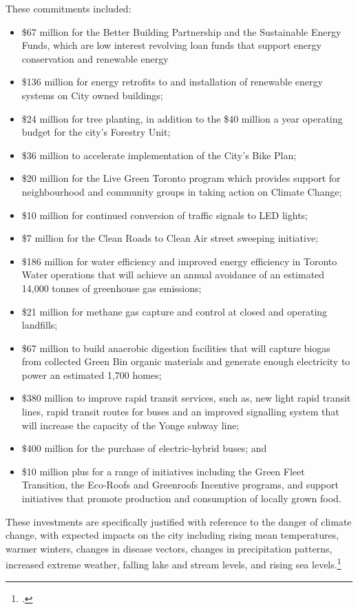 These commitments included:
\begin{itemize}
	\item \$67 million for the Better Building Partnership and the Sustainable Energy Funds, which are low interest revolving loan funds that support energy conservation and renewable energy
	\item \$136 million for energy retrofits to and installation of renewable energy systems on City owned buildings; 
	\item \$24 million for tree planting, in addition to the \$40 million a year operating budget for the city's Forestry Unit; 
	\item \$36 million to accelerate implementation of the City's Bike Plan; 
	\item \$20 million for the Live Green Toronto program which provides support for neighbourhood and community groups in taking action on Climate Change; 
	\item \$10 million for continued conversion of traffic signals to LED lights; 
	\item \$7 million for the Clean Roads to Clean Air street sweeping initiative; 
	\item \$186 million for water efficiency and improved energy efficiency in Toronto Water operations that will achieve an annual avoidance of an estimated 14,000 tonnes of greenhouse gas emissions; 
	\item \$21 million for methane gas capture and control at closed and operating landfills; 
	\item \$67 million to build anaerobic digestion facilities that will capture biogas from collected Green Bin organic materials and generate enough electricity to power an estimated 1,700 homes; 
	\item \$380 million to improve rapid transit services, such as, new light rapid transit lines, rapid transit routes for buses and an improved signalling system that will increase the capacity of the Yonge subway line; 
	\item \$400 million for the purchase of electric-hybrid buses; and 
	\item \$10 million plus for a range of initiatives including the Green Fleet Transition, the Eco-Roofs and Greenroofs Incentive programs, and support initiatives that promote production and consumption of locally grown food.
\end{itemize}

These investments are specifically justified with reference to the danger of climate change, with expected impacts on the city including rising mean temperatures, warmer winters, changes in disease vectors, changes in precipitation patterns, increased extreme weather, falling lake and stream levels, and rising sea levels.\footcite{TorontoEnvOff2007}

